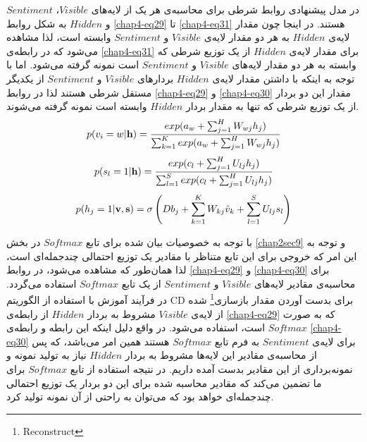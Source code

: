 در مدل پیشنهادی روابط شرطی برای محاسبه‌ی هر یک از لایه‌های
$Visible$، $Sentiment$
و
$Hidden$
 به شکل روابط
\ref{chap4-eq29}
تا
\ref{chap4-eq31}
هستند. در اینجا چون مقدار لایه‌ی
$Hidden$
به هر دو مقدار لایه‌ی
$Visible$
و
$Sentiment$
وابسته است، لذا مشاهده می‌‌شود که در رابطه‌ی
\ref{chap4-eq31}
برای مقدار لایه‌ی
$Hidden$
از یک توزیع شرطی که وابسته به هر دو مقدار لایه‌های
$Visible$
و
$Sentiment$
است نمونه گرفته می‌‌شود. اما با توجه به اینکه با داشتن مقدار لایه‌ی
$Hidden$
بردارهای
$Visible$
و
$Sentiment$
از یکدیگر مستقل شرطی هستند لذا در روابط
\ref{chap4-eq29}
و
\ref{chap4-eq30}
مقدار این دو بردار از یک توزیع شرطی که تنها به مقدار بردار
$Hidden$
وابسته است نمونه گرفته می‌‌شوند.
\begin{align}
	\centering
	\label{chap4-eq29}
	p(v_{i}=w|\textbf{h})=\dfrac{exp(a_{w}+\sum_{j=1}^{H}W_{wj}h_j)}{\sum_{k=1}^{K}exp(a_{w}+\sum_{j=1}^{H}W_{wj}h_j)}
\end{align}
\begin{align}
	\centering
	\label{chap4-eq30}
	p(s_{l}=1|\textbf{h})=\dfrac{exp(c_{l}+\sum_{j=1}^{H}U_{lj}h_j)}{\sum_{l=1}^{S}exp(c_{l}+\sum_{j=1}^{H}U_{lj}h_j)}
\end{align}
\begin{align}
	\centering
	\label{chap4-eq31}
	p(h_{j}=1|\textbf{v},\textbf{s})=\sigma \left( Db_j + \sum_{k=1}^{K}W_{kj}\hat{v}_k + \sum_{l=1}^{S}U_{lj}s_l \right)
\end{align}

با توجه به خصوصیات بیان شده برای تابع
$Softmax$
در بخش
\ref{chap2sec9}
و توجه به این امر که خروجی برای این تابع متناظر با مقادیر یک توزیع احتمالی‌ چندجمله‌ای است، لذا همان‌طور که مشاهده می‌‌شود، در روابط
\ref{chap4-eq29}
و
\ref{chap4-eq30}
برای محاسبه‌ی مقادیر لایه‌های
$Visible$
و
$Sentiment$
از یک تابع
$Softmax$
استفاده می‌‌گردد. در فرآیند آموزش با استفاده از الگوریتم
CD
برای بدست آوردن مقدار بازسازی\footnote{Reconstruct}
 شده از لایه‌ی
$Visible$
مشروط به بردار
$Hidden$
از رابطه‌ی
\ref{chap4-eq29}
که به صورت
$Softmax$
است، استفاده می‌‌شود. در واقع دلیل اینکه این رابطه و رابطه‌ی
\ref{chap4-eq30}
برای لایه‌ی
$Sentiment$
به فرم تابع
$Softmax$
هستند همین امر می‌‌باشد، که پس از محاسبه‌ی مقادیر این لایه‌ها مشروط به بردار
$Hidden$
نیاز به تولید نمونه و نمونه‌برداری از این مقادیر بدست آمده داریم. در نتیجه استفاده از تابع
$Softmax$
برای ما تضمین می‌‌کند که مقادیر محاسبه شده برای این دو بردار یک توزیع احتمالی‌ چندجمله‌ای خواهد بود که می‌‌توان به راحتی‌ از آن نمونه تولید کرد.



%

